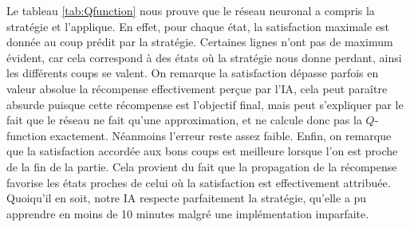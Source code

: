 Le tableau \ref{tab:Qfunction} nous prouve que le réseau neuronal a compris la stratégie et l'applique. En effet, pour chaque état, la satisfaction maximale est donnée
au coup prédit par la stratégie. Certaines lignes n'ont pas de maximum évident, car cela correspond à des états où la stratégie nous donne perdant, ainsi les différents
coups se valent. On remarque la satisfaction dépasse parfois en valeur absolue la récompense effectivement perçue par l'IA, cela peut paraître absurde puisque cette 
récompense est l'objectif final, mais peut s'expliquer par le fait que le réseau ne fait qu'une approximation, et ne calcule donc pas la $Q$-function exactement.
Néanmoins l'erreur reste assez faible. Enfin, on remarque que la satisfaction accordée aux bons coups est meilleure lorsque l'on est proche de la fin de la partie.
Cela provient du fait que la propagation de la récompense favorise les états proches de celui où la satisfaction est effectivement attribuée. Quoiqu'il en soit, notre IA
respecte parfaitement la stratégie, qu'elle a pu apprendre en moins de 10 minutes malgré une implémentation imparfaite.


